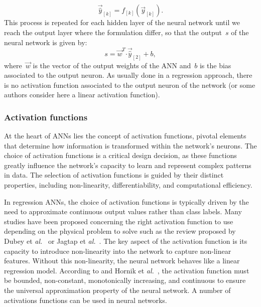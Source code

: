 \documentclass[algorithms,article,submit,pdftex,oneauthors]{Definitions/mdpi}
\makeatletter
\DeclareRobustCommand{\dotp}{\boldsymbol{\cdot}}
\DeclareRobustCommand{\lay}[1]{_{[#1]}}
\DeclareRobustCommand{\eal}{et \emph{al.}\@\xspace}
\makeatother
\begin{document}
\begin{equation}
\overrightarrow{\hat{y}}\lay{k}=f\lay{k}(\overrightarrow{y}\lay{k}).
\label{eq:ANN-f}
\end{equation}
This process is repeated for each hidden layer of the neural network until we reach the output layer where the formulation differ, so that the output~$s$ of the neural network is given by:
\begin{equation}
s = \overrightarrow{w}^T \dotp \overrightarrow{\hat{y}}\lay{2} + b\label{eq:ANN-s},
\end{equation}
where~$\overrightarrow{w}$ is the vector of the output weights of the ANN and~$b$ is the bias associated to the output neuron.
As usually done in a regression approach, there is no activation function associated to the output neuron of the network (or some authors consider here a linear activation function).

\subsubsection{Activation functions}\label{subsubsec:ANN-act}

At the heart of ANNs lies the concept of activation functions, pivotal elements that determine how information is transformed within the network's neurons.
The choice of activation functions is a critical design decision, as these functions greatly influence the network's capacity to learn and represent complex patterns in data.
The selection of activation functions is guided by their distinct properties, including non-linearity, differentiability, and computational efficiency.

In regression ANNs, the choice of activation functions is typically driven by the need to approximate continuous output values rather than class labels.
Many studies have been proposed concerning the right activation function to use depending on the physical problem to solve such as the review proposed by Dubey \eal~\cite{Dubey-2022-AFD} or Jagtap \eal~\cite{Jagtap-2023-HIA}.
The key aspect of the activation function is its capacity to introduce non-linearity into the network to capture non-linear features.
Without this non-linearity, the neural network behaves like a linear regression model.
According to and Hornik \eal~\cite{Hornik-1989-MFN}, the activation function must be bounded, non-constant, monotonically increasing, and continuous to ensure the universal approximation property of the neural network.
A number of activations functions can be used in neural networks.
\end{document}
